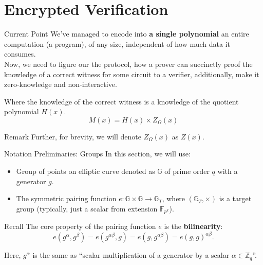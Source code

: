 \documentclass{zkdl-presentation-template}
\begin{document}
    \section{Encrypted Verification}

    \begin{frame}{Current Point}
        We've managed to encode into \textbf{a single polynomial} an entire computation (a program),
        of any size, independent of how much data it consumes. \\ \pause
        \vspace{10pt}
        Now, we need to figure our the protocol, how a prover can succinctly proof the knowledge of
        a correct witness for some circuit to a verifier, additionally, make it zero-knowledge and 
        non-interactive.\pause

        Where the knowledge of the correct witness is a knowledge of the quotient polynomial $H(x)$.
        \begin{equation*}
            M(x) = H(x) \times Z_{\Omega}(x)
        \end{equation*}

        \begin{block}{Remark}
            Further, for brevity, we will denote $Z_{\Omega}(x)$ as $Z(x)$.
        \end{block}
    \end{frame}

    \begin{frame}{Notation Preliminaries: Groups}
        In this section, we will use:
        \begin{itemize}[label=]
            \item Group of points on elliptic curve 
            denoted as $\mathbb{G}$ of prime order $q$ with a generator $g$.\pause
            \item The symmetric pairing function $e: \mathbb{G} \times \mathbb{G} \to \mathbb{G}_T$, where
            $(\mathbb{G}_T, \times)$ is a target group (typically, just a scalar from extension $\mathbb{F}_{p^k}$).
        \end{itemize}
        \begin{alertblock}{Recall}
            The core property of the pairing function $e$ is the \textbf{bilinearity}:
            \begin{equation*}
                e(g^{\alpha}, g^{\beta}) = e(g^{\alpha\beta}, g) = e(g, g^{\alpha\beta}) = e(g,g)^{\alpha\beta}.
            \end{equation*}

            Here, $g^{\alpha}$ is the same as ``scalar multiplication of a generator by a scalar $\alpha \in \mathbb{Z}_q$''.
        \end{alertblock}
    \end{frame}
\end{document}
